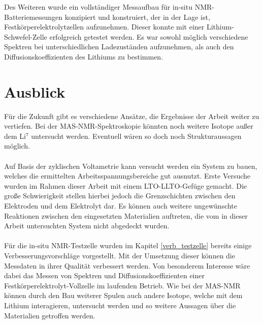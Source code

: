 \documentclass[a4paper, 11pt, headsepline,footsepline,twoside,abstract]{scrbook}
\begin{document}
Des Weiteren wurde ein vollständiger Messaufbau für in-situ NMR-Batterie\-messungen konzipiert und konstruiert, der in der Lage ist, Festkörperelektrolytzellen aufzunehmen. Dieser konnte mit einer Lithium-Schwefel-Zelle erfolgreich getestet werden. Es war sowohl möglich verschiedene Spektren bei unterschiedlichen Ladezuständen aufzunehmen, als auch den Diffusionskoeffizienten des Lithiums zu bestimmen.
\section{Ausblick}
Für die Zukunft gibt es verschiedene Ansätze, die Ergebnisse der Arbeit weiter zu vertiefen. Bei der MAS-NMR-Spektroskopie könnten noch weitere Isotope außer dem Li$^7$ untersucht werden. Eventuell wären so doch noch Strukturaussagen möglich.
\\\\
Auf Basis der zyklischen Voltametrie kann versucht werden ein System zu bauen, welches die ermittelten Arbeitsspannungsbereiche gut ausnutzt. Erste Versuche wurden im Rahmen dieser Arbeit mit einem LTO-LLTO-Gefüge gemacht. Die große Schwierigkeit stellen hierbei jedoch die Grenzschichten zwischen den Elektroden und dem Elektrolyt dar. Es können auch weitere ungewünschte Reaktionen zwischen den eingesetzten Materialien auftreten, die vom in dieser Arbeit untersuchten System nicht abgedeckt wurden.
\\\\
Für die in-situ NMR-Testzelle wurden im Kapitel \ref{verb_testzelle} bereits einige Verbesserungsvorschläge vorgestellt. Mit der Umsetzung dieser können die Messdaten in ihrer Qualität verbessert werden. Von besonderem Interesse wäre dabei das Messen von Spektren und Diffusionskoeffizienten einer Festkörperelektrolyt-Vollzelle im laufenden Betrieb. Wie bei der MAS-NMR können durch den Bau weiterer Spulen auch andere Isotope, welche mit dem Lithium interagieren, untersucht werden und so weitere Aussagen über die Materialien getroffen werden.
\renewcommand{\thesection}{\Alph{section}}
\end{document}
